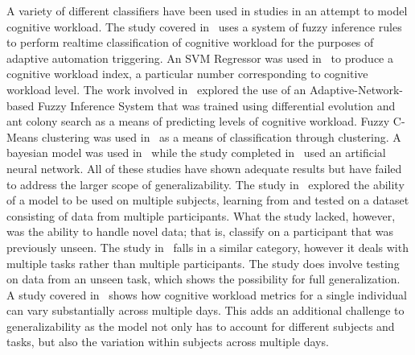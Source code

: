 \documentclass[11pt]{article}
\begin{document}
A variety of different classifiers have been used in studies in an attempt to model cognitive workload. The study covered in~\cite{Yang} uses a system of fuzzy inference rules to perform realtime classification of cognitive workload for the purposes of adaptive automation triggering. An SVM Regressor was used in~\cite{Ke} to produce a cognitive workload index, a particular number corresponding to cognitive workload level. The work involved in~\cite{Wang_R} explored the use of an Adaptive-Network-based Fuzzy Inference System that was trained using differential evolution and ant colony search as a means of predicting levels of cognitive workload. Fuzzy C-Means clustering was used in~\cite{Zhang} as a means of classification through clustering. A bayesian model was used in~\cite{Wang_Z} while the study completed in~\cite{Wilson} used an artificial neural network. All of these studies have shown adequate results but have failed to address the larger scope of generalizability. The study in~\cite{Wang_Z} explored the ability of a model to be used on multiple subjects, learning from and tested on a dataset consisting of data from multiple participants. What the study lacked, however, was the ability to handle novel data; that is, classify on a participant that was previously unseen. The study in~\cite{Wang_Z} falls in a similar category, however it deals with multiple tasks rather than multiple participants. The study does involve testing on data from an unseen task, which shows the possibility for full generalization. A study covered in~\cite{Christensen} shows how cognitive workload metrics for a single individual can vary substantially across multiple days. This adds an additional challenge to generalizability as the model not only has to account for different subjects and tasks, but also the variation within subjects across multiple days.
\end{document}
